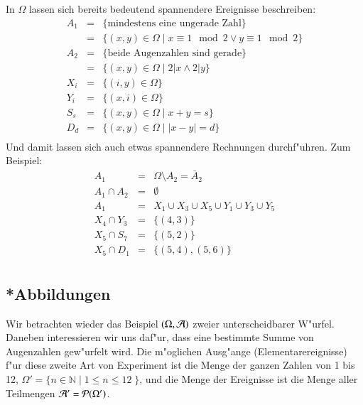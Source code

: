In $\Omega$ lassen sich bereits bedeutend spannendere Ereignisse
beschreiben:
\begin{eqnarray*}
A_1&=&\{\text{mindestens eine ungerade Zahl}\}\\
   &=&\{(x,y)\in\Omega\;|\;x \equiv 1\mod 2 \vee y\equiv 1\mod 2\}\\
A_2&=&\{\text{beide Augenzahlen sind gerade}\}\\
   &=&\{(x,y)\in\Omega\;|\;2|x \wedge 2|y\}\\
X_i&=&\{(i,y)\in\Omega\}\\
Y_i&=&\{(x,i)\in\Omega\}\\
S_s&=&\{(x,y)\in\Omega\;|\; x + y = s\}\\
D_d&=&\{(x,y)\in\Omega\;|\; |x - y| = d\}\\
\end{eqnarray*}
Und damit lassen sich auch etwas spannendere Rechnungen durchf"uhren. Zum
Beispiel:
\begin{eqnarray*}
A_1&=&\Omega \setminus A_2 = \bar A_2\\
A_1\cap A_2&=&\emptyset\\
A_1&=&X_1\cup X_3 \cup X_5\cup Y_1\cup Y_3\cup Y_5\\
X_4\cap Y_3&=&\{(4,3)\}\\
X_5\cap S_7&=&\{(5,2)\}\\
X_5\cap D_1&=&\{(5,4), (5,6)\}\\
\end{eqnarray*}


\subsection{*Abbildungen}
Wir betrachten wieder das Beispiel $(\Omega,\cal A)$
zweier unterscheidbarer W"urfel. Daneben
interessieren wir uns daf"ur, dass eine bestimmte Summe von Augenzahlen
gew"urfelt wird. Die m"oglichen Ausg"ange (Elementarereignisse)
f"ur diese zweite Art von
Experiment ist die Menge der ganzen Zahlen von 1 bis 12,
$\Omega'=\{n\in\mathbb N\;|\;1 \le n \le 12\;\}$, und die
Menge der Ereignisse ist die Menge aller Teilmengen
${\cal A}'={\cal P}(\Omega')$.


